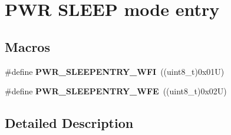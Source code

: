 \hypertarget{group___p_w_r___s_l_e_e_p__mode__entry}{}\section{P\+WR S\+L\+E\+EP mode entry}
\label{group___p_w_r___s_l_e_e_p__mode__entry}
\subsection*{Macros}
\begin{DoxyCompactItemize}
\item 
\mbox{\label{group___p_w_r___s_l_e_e_p__mode__entry_ga4f0f99a3526c57efb3501b016639fa45}} 
\#define {\bfseries P\+W\+R\+\_\+\+S\+L\+E\+E\+P\+E\+N\+T\+R\+Y\+\_\+\+W\+FI}~((uint8\+\_\+t)0x01\+U)
\item 
\mbox{\label{group___p_w_r___s_l_e_e_p__mode__entry_ga2ef4bd42ad37dcfcd0813676087d559e}} 
\#define {\bfseries P\+W\+R\+\_\+\+S\+L\+E\+E\+P\+E\+N\+T\+R\+Y\+\_\+\+W\+FE}~((uint8\+\_\+t)0x02\+U)
\end{DoxyCompactItemize}


\subsection{Detailed Description}
